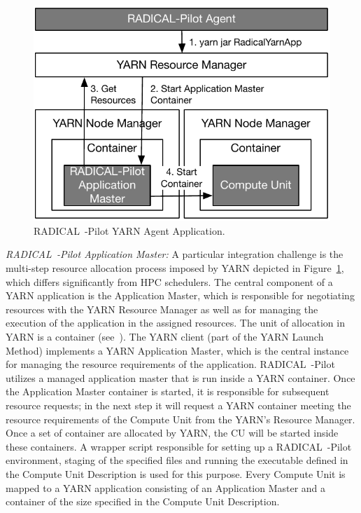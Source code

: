\begin{figure}[t]
    \centering
    \includegraphics[width=.95\textwidth]{figures/data_analytics_hpc/hpc_hadoop/yarn.pdf}
    \caption{RADICAL~-Pilot YARN Agent Application.}
    \label{fig:figures_yarn}
\end{figure}

\emph{RADICAL~-Pilot Application Master:}
A particular integration challenge is the multi-step resource allocation process imposed by YARN depicted in Figure~\ref{fig:figures_yarn}, which differs significantly from HPC schedulers.
The central component of a YARN application is the Application Master, which is responsible for negotiating resources with the YARN Resource Manager as well as for managing the execution of the application in the assigned resources.
The unit of allocation in YARN is a container (see~\cite{murthy2014apache}).
The YARN client (part of the YARN Launch Method) implements a YARN Application Master, which is the central instance for managing the resource requirements of the application.
RADICAL~-Pilot utilizes a managed application master that is run inside a YARN container.
Once the Application Master container is started, it is responsible for subsequent resource requests; in the next step it will request a YARN container meeting the resource requirements of the Compute Unit from the YARN's Resource Manager.
Once a set of container are allocated by YARN, the CU will be started inside these containers.
A wrapper script responsible for setting up a RADICAL~-Pilot environment, staging of the specified files and running the executable defined in the Compute Unit Description is used for this purpose.
Every Compute Unit is mapped to a YARN application consisting of an Application Master and a container of the size specified in the Compute Unit Description.

